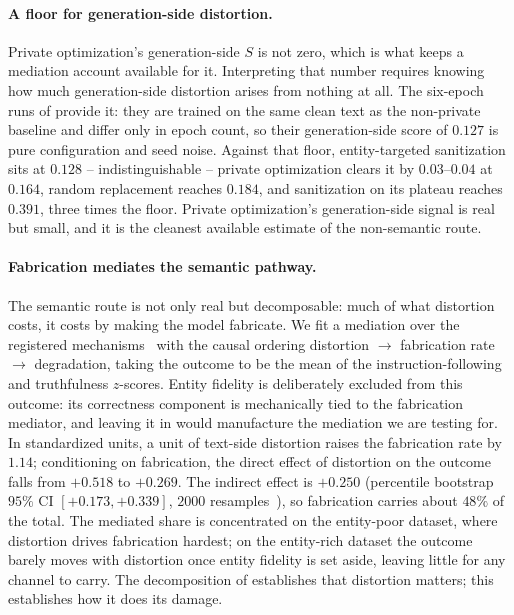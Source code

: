 \paragraph{A floor for generation-side distortion.}
Private optimization's generation-side $S$ is not zero,
which is what keeps a mediation account available for it.
Interpreting that number requires knowing how much generation-side distortion arises from nothing at all.
The six-epoch runs of  provide it:
they are trained on the same clean text as the non-private baseline and differ only in epoch count,
so their generation-side score of $0.127$ is pure configuration and seed noise.
Against that floor,
entity-targeted sanitization sits at $0.128$ -- indistinguishable -- private optimization clears it by $0.03$--$0.04$ at $0.164$,
random replacement reaches $0.184$,
and sanitization on its plateau reaches $0.391$,
three times the floor.
Private optimization's generation-side signal is real but small,
and it is the cleanest available estimate of the non-semantic route.

\paragraph{Fabrication mediates the semantic pathway.}
The semantic route is not only real but decomposable:
much of what distortion costs,
it costs by making the model fabricate.
We fit a mediation over the registered mechanisms~\citep{baron1986moderator, imai2010general} with the causal ordering distortion $\to$ fabrication rate $\to$ degradation,
taking the outcome to be the mean of the instruction-following and truthfulness $z$-scores.
Entity fidelity is deliberately excluded from this outcome:
its correctness component is mechanically tied to the fabrication mediator,
and leaving it in would manufacture the mediation we are testing for.
In standardized units,
a unit of text-side distortion raises the fabrication rate by $1.14$;
conditioning on fabrication,
the direct effect of distortion on the outcome falls from $+0.518$ to $+0.269$.
The indirect effect is $+0.250$ (percentile bootstrap $95\%$ CI $[+0.173, +0.339]$, $2000$ resamples~\citep{preacher2008asymptotic}),
so fabrication carries about $48\%$ of the total.
The mediated share is concentrated on the entity-poor dataset,
where distortion drives fabrication hardest;
on the entity-rich dataset the outcome barely moves with distortion once entity fidelity is set aside,
leaving little for any channel to carry.
The decomposition of  establishes that distortion matters;
this establishes how it does its damage.

